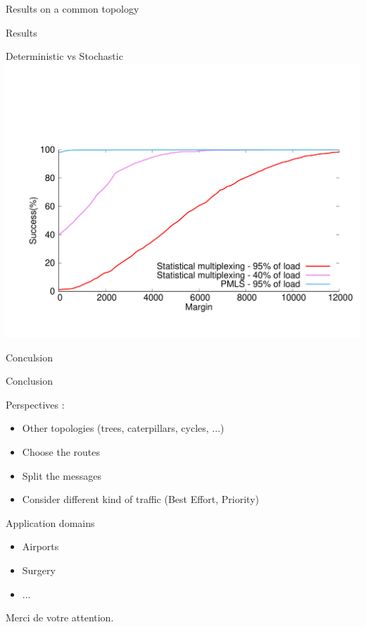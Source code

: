 \documentclass[10 pt]{beamer}
\begin{document}
\begin{section}{Results on a common topology}
\begin{subsection}{Results}
    \begin{frame}{Deterministic vs Stochastic}
\centering
\vspace{-2cm}
  \includegraphics[scale=0.4]{stochastic.pdf}\\
  \end{frame}
\end{subsection}

\end{section}

\begin{section}{Conculsion}
\begin{frame}{Conclusion}

  
 \begin{multicols}{2}
Perspectives :
\begin{itemize}
\item  Other topologies (trees, caterpillars, cycles, ...)
\item Choose the routes
\item Split the messages
\item Consider different kind of traffic (Best Effort, Priority)
\end{itemize}
\vspace{0.5cm}
Application domains
\begin{itemize}
\item Airports
\item Surgery
\item ...
\end{itemize}
\end{multicols}

\end{frame}

\begin{frame}
Merci de votre attention.

\end{frame}
\end{section}
\end{document}
